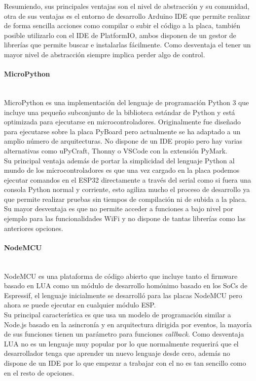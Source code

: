 \documentclass[../proyecto.tex]{subfiles}
\begin{document}
Resumiendo, sus principales ventajas son el nivel de abstracción y su comunidad, otra de sus ventajas es el entorno de desarrollo Arduino IDE que permite realizar de forma sencilla acciones como compilar o subir el código a la placa, también posible utilizarlo con el IDE de PlatformIO, ambos disponen de un gestor de librerías que permite buscar e instalarlas fácilmente. Como desventaja el tener un mayor nivel de abstracción siempre implica perder algo de control.\\

\paragraph{MicroPython}\mbox{}\\
MicroPython es una implementación del lenguaje de programación Python 3 que incluye una pequeño subconjunto de la biblioteca estándar de Python y está optimizada para ejecutarse en microcontroladores. Originalmente fue diseñado para ejecutarse sobre la placa PyBoard pero actualmente se ha adaptado a un amplio número de arquitecturas. No dispone de un IDE propio pero hay varias alternativas como uPyCraft, Thonny o  VSCode con la extensión PyMark.\\

Su principal ventaja además de portar la simplicidad del lenguaje Python al mundo de los microcontroladores es que una vez cargado en la placa podemos ejecutar comandos en el ESP32 directamente a través del serial como si fuera una consola Python normal y corriente, esto agiliza mucho el proceso de desarrollo ya que permite realizar pruebas sin tiempos de compilación ni de subida a la placa. Su mayor desventaja es que no permite acceder  a funciones a bajo nivel por ejemplo para las funcionalidades WiFi y no dispone de tantas librerías como las anteriores opciones.\\

\paragraph{NodeMCU}\mbox{}\\
NodeMCU es una plataforma de código abierto que incluye tanto el firmware basado en LUA como un módulo de desarrollo homónimo basado en los SoCs de Espressif, el lenguaje inicialmente se desarrolló para las placas NodeMCU pero ahora se puede ejecutar en cualquier módulo ESP.\\

Su principal característica es que usa un modelo de programación similar a Node.js basado en la  asincronía  y en arquitectura dirigida por eventos, la mayoría de sus funciones tienen un parámetro para funciones \textit{callback}. Como desventaja LUA no es un lenguaje muy popular por lo que normalmente requerirá que el desarrollador tenga que aprender un nuevo lenguaje desde cero, además no dispone de un IDE por lo que empezar a trabajar con el no es tan sencillo como en el resto de opciones.\\
\end{document}
